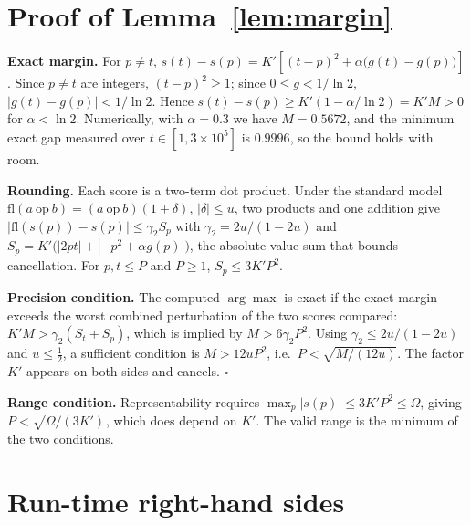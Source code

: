 \documentclass{article}
\theoremstyle{definition}
\begin{document}



\appendix
\section{Proof of Lemma~\ref{lem:margin}}\label{app:proof}

\textbf{Exact margin.} For $p\neq t$,
$s(t)-s(p)=K'\left[(t-p)^2+\alpha\bigl(g(t)-g(p)\bigr)\right]$. Since $p\neq t$
are integers, $(t-p)^2\ge1$; since $0\le g<1/\ln2$, $|g(t)-g(p)|<1/\ln2$. Hence
$s(t)-s(p)\ge K'(1-\alpha/\ln2)=K'M>0$ for $\alpha<\ln2$. Numerically, with
$\alpha=0.3$ we have $M=0.5672$, and the minimum exact gap measured over
$t\in[1,3\times10^5]$ is $0.9996$, so the bound holds with room.

\textbf{Rounding.} Each score is a two-term dot product. Under the standard model
$\mathrm{fl}(a\ \mathrm{op}\ b)=(a\ \mathrm{op}\ b)(1+\delta)$, $|\delta|\le u$,
two products and one addition give
$|\mathrm{fl}(s(p))-s(p)|\le\gamma_2 S_p$ with $\gamma_2=2u/(1-2u)$ and
$S_p=K'\bigl(|2pt|+|-p^2+\alpha g(p)|\bigr)$, the absolute-value sum that bounds
cancellation. For $p,t\le P$ and $P\ge1$, $S_p\le 3K'P^2$.

\textbf{Precision condition.} The computed $\arg\max$ is exact if the exact
margin exceeds the worst combined perturbation of the two scores compared:
$K'M>\gamma_2(S_t+S_p)$, which is implied by $M>6\gamma_2P^2$. Using
$\gamma_2\le2u/(1-2u)$ and $u\le\frac12$, a sufficient condition is
$M>12uP^2$, i.e.\ $P<\sqrt{M/(12u)}$. The factor $K'$ appears on both sides and
cancels. $\square$

\textbf{Range condition.} Representability requires
$\max_p|s(p)|\le3K'P^2\le\Omega$, giving $P<\sqrt{\Omega/(3K')}$, which does
depend on $K'$. The valid range is the minimum of the two conditions.

\section{Run-time right-hand sides}\label{app:runtime}
\end{document}
